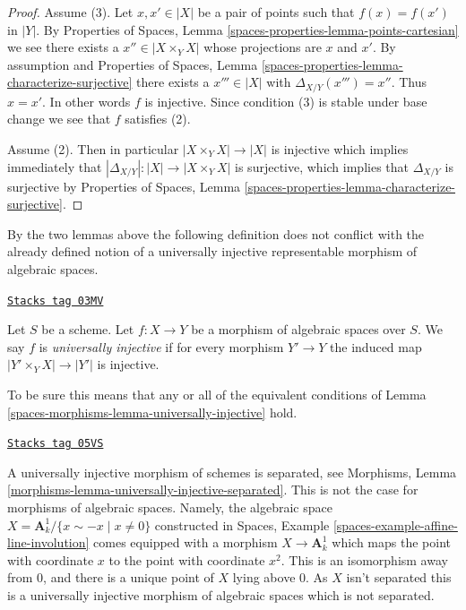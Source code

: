 \begin{proof}
\medskip\noindent
Assume (3). Let $x, x' \in |X|$ be a pair of points such that
$f(x) = f(x')$ in $|Y|$. By
Properties of Spaces, Lemma \ref{spaces-properties-lemma-points-cartesian}
we see there exists a $x'' \in |X \times_Y X|$ whose projections
are $x$ and $x'$. By assumption and
Properties of Spaces,
Lemma \ref{spaces-properties-lemma-characterize-surjective}
there exists a $x''' \in |X|$ with $\Delta_{X/Y}(x''') = x''$.
Thus $x = x'$. In other words $f$ is injective.
Since condition (3) is stable under base change we see that $f$
satisfies (2).

\medskip\noindent
Assume (2). Then in particular $|X \times_Y X| \to |X|$ is injective
which implies immediately that
$|\Delta_{X/Y}| : |X| \to |X \times_Y X|$ is surjective, which
implies that $\Delta_{X/Y}$ is surjective by
Properties of Spaces,
Lemma \ref{spaces-properties-lemma-characterize-surjective}.
\end{proof}

By the two lemmas above the following definition does not conflict with
the already defined notion of a universally injective representable morphism
of algebraic spaces.

\begin{definition}
\label{spaces-morphisms-definition-universally-injective}
\href{https://stacks.math.columbia.edu/tag/03MV}{\texttt{Stacks tag 03MV}}

Let $S$ be a scheme. Let $f : X \to Y$ be a morphism of algebraic
spaces over $S$. We say $f$ is {\it universally injective} if
for every morphism $Y' \to Y$ the induced map
$|Y' \times_Y X| \to |Y'|$ is injective.
\end{definition}

To be sure this means that any or all of the equivalent conditions of
Lemma \ref{spaces-morphisms-lemma-universally-injective}
hold.

\begin{remark}
\label{spaces-morphisms-remark-universally-injective-not-separated}
\href{https://stacks.math.columbia.edu/tag/05VS}{\texttt{Stacks tag 05VS}}

A universally injective morphism of schemes is separated, see
Morphisms, Lemma
\ref{morphisms-lemma-universally-injective-separated}.
This is not the case for morphisms of algebraic spaces.
Namely, the algebraic space
$X = \mathbf{A}^1_k/\{x \sim -x \mid x \not = 0\}$
constructed in
Spaces, Example \ref{spaces-example-affine-line-involution}
comes equipped with a morphism $X \to \mathbf{A}^1_k$ which maps
the point with coordinate $x$ to the point with coordinate $x^2$.
This is an isomorphism away from $0$, and there is a unique point
of $X$ lying above $0$. As $X$ isn't separated this is a universally
injective morphism of algebraic spaces which is not separated.
\end{remark}

